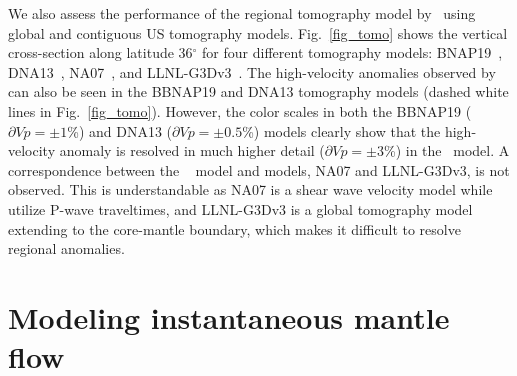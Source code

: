 \documentclass[draft,linenumbers]{agujournal2018}
\begin{document}
We also assess the performance of the regional tomography model by~\citet{Biryol_2016} using global and  contiguous US tomography models. Fig.~\ref{fig_tomo} shows the vertical cross-section along latitude 36$^\circ$ for four different tomography models: BNAP19~\citep[P-wave tomography model of the continental US concentrating on the upper mantle structure by][]{boyce2019variable}, DNA13~\citep[P-wave and S-wave velocity model for the contiguous US by][]{porritt2014seismic}, NA07~\citep[S-wave velocity model of the upper mantle in North America by][]{bedle2009s}, and LLNL-G3Dv3~\citep[Global P-wave tomography model by][]{simmons2012llnl}. The high-velocity anomalies observed by~\citet{Biryol_2016} can also be seen in the BBNAP19 and DNA13 tomography models (dashed white lines in Fig.~\ref{fig_tomo}). However, the color scales in both the BBNAP19 ($\partial Vp=\pm1$\%) and DNA13 ($\partial Vp=\pm0.5$\%) models clearly show that the high-velocity anomaly is resolved in much higher detail ($\partial Vp=\pm3$\%) in the~\citet{Biryol_2016} model. A correspondence between the ~\citet{Biryol_2016} model and models, NA07 and LLNL-G3Dv3, is not observed. This is understandable as NA07 is a shear wave velocity model while~\citet{Biryol_2016} utilize P-wave traveltimes, and  LLNL-G3Dv3 is a global tomography model extending to the core-mantle boundary, which makes it difficult to resolve regional anomalies. 

\section{Modeling instantaneous mantle flow}
    
\end{document}
